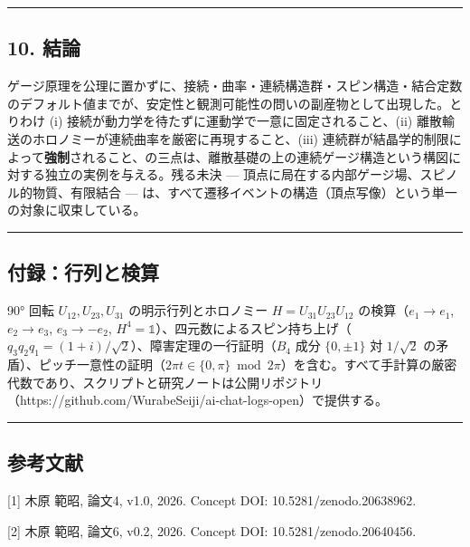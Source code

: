 \documentclass[
]{ltjsarticle}
\begin{document}
\begin{center}\rule{0.5\linewidth}{0.5pt}\end{center}

\subsection{10. 結論}\label{ux7d50ux8ad6}

ゲージ原理を公理に置かずに、接続・曲率・連続構造群・スピン構造・結合定数のデフォルト値までが、安定性と観測可能性の問いの副産物として出現した。とりわけ
(i) 接続が動力学を待たずに運動学で一意に固定されること、(ii)
離散輸送のホロノミーが連続曲率を厳密に再現すること、(iii)
連続群が結晶学的制限によって\textbf{強制}されること、の三点は、離散基礎の上の連続ゲージ構造という構図に対する独立の実例を与える。残る未決
--- 頂点に局在する内部ゲージ場、スピノル的物質、有限結合 ---
は、すべて遷移イベントの構造（頂点写像）という単一の対象に収束している。

\begin{center}\rule{0.5\linewidth}{0.5pt}\end{center}

\subsection{付録：行列と検算}\label{ux4ed8ux9332ux884cux5217ux3068ux691cux7b97}

90° 回転 \(U_{12},U_{23},U_{31}\) の明示行列とホロノミー
\(H=U_{31}U_{23}U_{12}\) の検算（\(e_1\to e_1\), \(e_2\to e_3\),
\(e_3\to-e_2\),
\(H^4=\mathbb1\)）、四元数によるスピン持ち上げ（\(q_3q_2q_1=(1+i)/\sqrt2\)）、障害定理の一行証明（\(B_4\)
成分 \(\{0,\pm1\}\) 対 \(1/\sqrt2\)
の矛盾）、ピッチ一意性の証明（\(2\pi t\in\{0,\pi\}\bmod 2\pi\)）を含む。すべて手計算の厳密代数であり、スクリプトと研究ノートは公開リポジトリ（https://github.com/WurabeSeiji/ai-chat-logs-open）で提供する。

\begin{center}\rule{0.5\linewidth}{0.5pt}\end{center}

\subsection{参考文献}\label{ux53c2ux8003ux6587ux732e}

{[}1{]} 木原 範昭, 論文4, v1.0, 2026. Concept DOI:
10.5281/zenodo.20638962.

{[}2{]} 木原 範昭, 論文6, v0.2, 2026. Concept DOI:
10.5281/zenodo.20640456.
\end{document}
